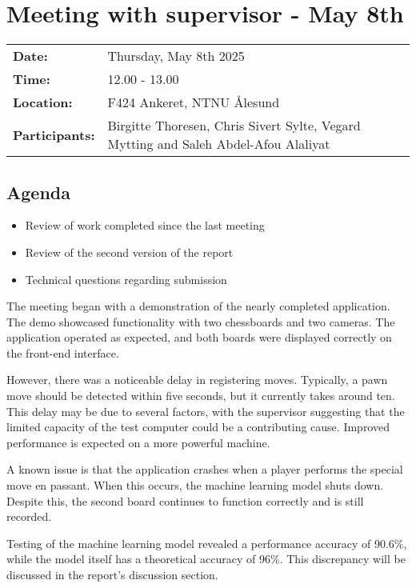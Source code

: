\section{Meeting with supervisor - May 8th}
\begin{tabular}{ll}
    \textbf{Date:} & Thursday, May 8th 2025 \\
    \textbf{Time:} & 12.00 - 13.00\\
    \textbf{Location:} & F424 Ankeret, NTNU Ålesund \\
    \textbf{Participants:} & Birgitte Thoresen, Chris Sivert Sylte, Vegard Mytting and Saleh Abdel-Afou Alaliyat\\
\end{tabular}

\vspace{0.5cm}

\subsection{Agenda}

\begin{itemize} 
    \item Review of work completed since the last meeting
    \item Review of the second version of the report
    \item Technical questions regarding submission
\end{itemize}

The meeting began with a demonstration of the nearly completed application. The demo showcased functionality with two chessboards and two cameras. The application operated as expected, and both boards were displayed correctly on the front-end interface.

However, there was a noticeable delay in registering moves. Typically, a pawn move should be detected within five seconds, but it currently takes around ten. This delay may be due to several factors, with the supervisor suggesting that the limited capacity of the test computer could be a contributing cause. Improved performance is expected on a more powerful machine.

A known issue is that the application crashes when a player performs the special move en passant. When this occurs, the machine learning model shuts down. Despite this, the second board continues to function correctly and is still recorded.

Testing of the machine learning model revealed a performance accuracy of 90.6\%, while the model itself has a theoretical accuracy of 96\%. This discrepancy will be discussed in the report’s discussion section. 

